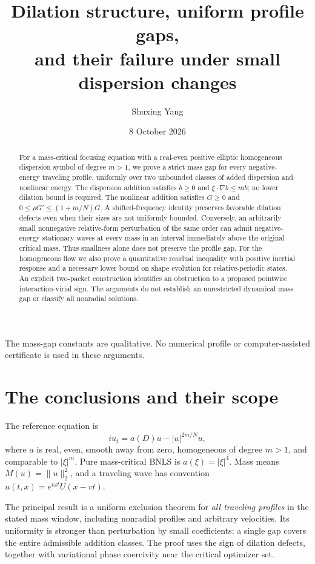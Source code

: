 \documentclass[11pt,a4paper]{article}
\title{Dilation structure, uniform profile gaps,\\and their failure under small dispersion changes}
\author{Shuxing Yang}
\date{8 October 2026}
\theoremstyle{remark}\newtheorem{remark}[theorem]{Remark}
\begin{document}
\maketitle
\begin{abstract}
For a mass-critical focusing equation with a real-even positive elliptic homogeneous dispersion symbol of degree $m>1$, we prove a strict mass gap for every negative-energy traveling profile, uniformly over two unbounded classes of added dispersion and nonlinear energy. The dispersion addition satisfies $b\ge0$ and $\xi\cdot\nabla b\le mb$; no lower dilation bound is required. The nonlinear addition satisfies $G\ge0$ and $0\le\rho G'\le(1+m/N)G$. A shifted-frequency identity preserves favorable dilation defects even when their sizes are not uniformly bounded. Conversely, an arbitrarily small nonnegative relative-form perturbation of the same order can admit negative-energy stationary waves at every mass in an interval immediately above the original critical mass. Thus smallness alone does not preserve the profile gap. For the homogeneous flow we also prove a quantitative residual inequality with positive inertial response and a necessary lower bound on shape evolution for relative-periodic states. An explicit two-packet construction identifies an obstruction to a proposed pointwise interaction-virial sign. The arguments do not establish an unrestricted dynamical mass gap or classify all nonradial solutions.
\end{abstract}
The mass-gap constants are qualitative. No numerical profile or computer-assisted certificate is used in these arguments.

\section*{The conclusions and their scope}
The reference equation is
\[
 i u_t=a(D)u-|u|^{2m/N}u,
\]
where $a$ is real, even, smooth away from zero, homogeneous of degree $m>1$, and comparable to $|\xi|^m$. Pure mass-critical BNLS is $a(\xi)=|\xi|^4$. Mass means $M(u)=\|u\|_2^2$, and a traveling wave has convention $u(t,x)=e^{i\omega t}U(x-vt)$.

The principal result is a uniform exclusion theorem for \emph{all traveling profiles} in the stated mass window, including nonradial profiles and arbitrary velocities. Its uniformity is stronger than perturbation by small coefficients: a single gap covers the entire admissible addition classes. The proof uses the sign of dilation defects, together with variational phase coercivity near the critical optimizer set.
\end{document}

